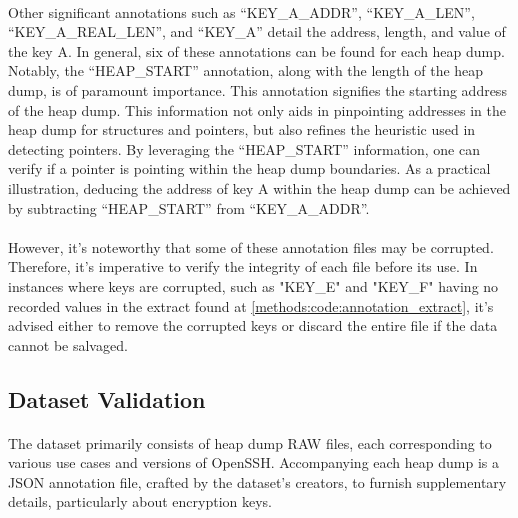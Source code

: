         \paragraph{}Other significant annotations such as ``KEY\_A\_ADDR'', ``KEY\_A\_LEN'', ``KEY\_A\_REAL\_LEN'', and ``KEY\_A'' detail the address, length, and value of the key A. In general, six of these annotations can be found for each heap dump. Notably, the ``HEAP\_START'' annotation, along with the length of the heap dump, is of paramount importance. This annotation signifies the starting address of the heap dump. This information not only aids in pinpointing addresses in the heap dump for structures and \glspl{pointer}, but also refines the heuristic used in detecting \glspl{pointer}. By leveraging the ``HEAP\_START'' information, one can verify if a \gls{pointer} is pointing within the heap dump boundaries. As a practical illustration, deducing the address of key A within the heap dump can be achieved by subtracting ``HEAP\_START'' from ``KEY\_A\_ADDR''.

        \paragraph{}However, it's noteworthy that some of these annotation files may be corrupted. Therefore, it's imperative to verify the integrity of each file before its use. In instances where keys are corrupted, such as "KEY\_E" and "KEY\_F" having no recorded values in the extract found at \ref{methods:code:annotation_extract}, it's advised either to remove the corrupted keys or discard the entire file if the data cannot be salvaged.
    
    \subsection{Dataset Validation}
        \paragraph{}The dataset primarily consists of heap dump RAW files, each corresponding to various use cases and versions of OpenSSH. Accompanying each heap dump is a JSON annotation file, crafted by the dataset's creators, to furnish supplementary details, particularly about encryption keys.
        
